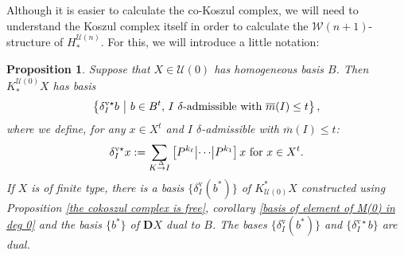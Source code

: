 \documentclass[11pt]{amsart} \renewcommand{\baselinestretch}{1.4}
\theoremstyle{plain}
\newtheorem{prop}[thm]{Proposition}
\theoremstyle{definition}
\newcommand{\calU}{\mathcal{U}}
\newcommand{\calw}{\mathcal{W}}
\newcommand{\deltaalg}{\Delta} %
\newcommand{\minDimP}{\overline{m}}
\newcommand{\produces}[3]{#3:#1\sim #2}
\renewcommand{\produces}[3]{#1\rightarrow_{#3} #2}%
\renewcommand{\produces}[3]{#1\overset{\smash{#3}}{\rightarrow} #2}%
\newcommand{\uver}{^\mathrm{v}}
\newcommand{\deltav}{\delta\uver}
\newcommand{\deltavstar}{\delta^{\mathrm{v}\star}}
\newcommand{\dual}{\mathbf{D}}
\begin{document}
\begin{Koszul complexes}
Although it is easier to calculate the co-Koszul complex, we will need to understand the Koszul complex itself in order to calculate the $\calw(n+1)$-structure of $H_*^{\calU(n)}$. For this, we will introduce a little notation:
\begin{prop}
\label{propDerivedIndTrivialUobject n=0}
Suppose that $X\in\calU(0)$ has homogeneous basis $B$. Then $K_*^{\calU(0)}X$ has basis
\[\left\{\deltavstar_Ib\ \middle|\ b\in B^t\textup{, $I$ $\delta$-admissible with }\minDimP(I)\leq t\right\},\]
where we define, for any $x \in X^t$ and $I$ $\delta$-admissible with $\minDimP(I)\leq t$:
\[\deltavstar_Ix:=
\sum_{\produces{K}{I}{\deltaalg}}\left[P^{k_\ell} \middle|\cdots\middle|P^{k_1} \right]x\textup{ for $x\in X^t$}.\]
%
If $X$ is of finite type, there is a basis $\{\deltav_I(b^*)\}$ of $K^*_{\calU(0)}X$ constructed using Proposition \ref{the cokoszul complex is free}, corollary \ref{basis of element of M(0) in deg 0} and the basis $\{b^*\}$ of $\dual X$ dual to $B$. The bases $\{\deltav_I(b^*)\}$ and $\{\deltavstar_Ib\}$ are dual.


\end{prop}
\end{Koszul complexes}
\end{document}
